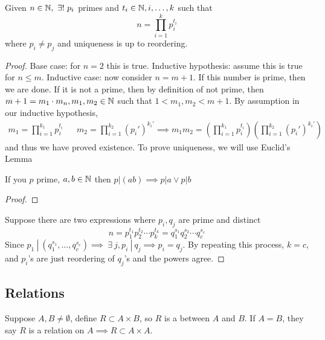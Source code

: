 \documentclass[12pt]{scrartcl}
\begin{document}
\begin{theorem}
  Given $n \in \mathbb N, \ \exists! \ p_i$ primes and $t_i \in \mathbb N, i, \ldots, k$ such that 
  \[n = \prod_{i=1}^k p_i^{t_i}\]
  where $p_i \neq p_j$ and uniqueness is up to reordering.

  \begin{proof}
    Base case: for $n = 2$ this is true. Inductive hypothesis: assume this is true for $n \leq m$. 
    Inductive case: now consider $n = m +1$. If this number is prime, then we are done. If it is not a prime, 
    then by definition of not prime, then $m + 1 = m_1 \cdot m_n, m_1, m_2 \in \mathbb N$ such that 
    $1 < m_1, m_2 < m + 1$. By assumption in our inductive hypothesis,
    \begin{align*}
      m_1 = \prod_{i=1}^{k_1} p_i^{t_i} && m_2 = \prod_{i=1}^{k_2} (p_i')^{k_i'} \implies m_1m_2 = \left(\prod_{i=1}^{k_1} p_i^{t_i}\right)\left(\prod_{i=1}^{k_2} (p_i')^{k_i'}\right)
    \end{align*}
    and thus we have proved existence. To prove uniqueness, we will use Euclid's Lemma

    \begin{lemma}
      If you $p$ prime, $a, b \in \mathbb N$ then $p | (ab) \implies p|a \lor p|b$

      \begin{proof}
        
      \end{proof}
    \end{lemma}

    Suppose there are two expressions where $p_i, q_j$ are prime and distinct 
    \[n = p_1^{t_1}p_2^{t_2} \cdots p_k^{t_k} = q_1^{s_1}q_2^{s_2}\cdots q_c^{s_c}\]
    Since $p_1 \ | \ (q_1^{s_1}, \ldots, q_c^{s_c}) \implies \ \exists \ j, p_i \ | \ q_j \implies p_i = q_j$. 
    By repeating this process, $k=c$, and $p_i$'s are just reordering of $q_j$'s and the 
    powers agree.
  \end{proof}
\end{theorem}

\subsection{Relations}

\begin{definition}[Relation]
  Suppose $A, B \neq \emptyset$, define $R \subset A \times B$, so $R$ is a  between
  $A$ and $B$. If $A = B$, they say $R$ is a relation on $A \implies R \subset A \times A$. 
\end{definition}
\end{document}
